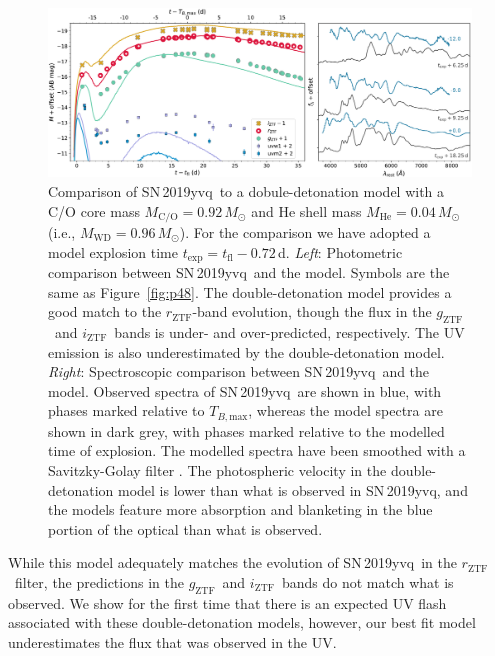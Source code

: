\documentclass[twocolumn]{aastex63}
\newcommand{\rztf}{$r_\mathrm{ZTF}$}
\newcommand{\gztf}{$g_\mathrm{ZTF}$}
\newcommand{\iztf}{$i_\mathrm{ZTF}$}
\newcommand{\tbmax}{$T_{B,\mathrm{max}}$}
\newcommand{\sn}{SN\,2019yvq}
\begin{document}
\begin{figure}
    \centering
    \includegraphics[width=\textwidth]{./figures/double_det.pdf}
    \caption{Comparison of \sn\ to a dobule-detonation model with a C/O core
    mass $M_\mathrm{C/O} = 0.92\,M_\odot$ and He shell mass $M_\mathrm{He} =
    0.04\,M_\odot$ (i.e., $M_\mathrm{WD} = 0.96\,M_\odot$). For the comparison
    we have adopted a model explosion time $t_\mathrm{exp} = t_\mathrm{fl} -
    0.72$\,d. \textit{Left}: Photometric comparison between \sn\ and the
    model. Symbols are the same as Figure~\ref{fig:p48}. The double-detonation
    model provides a good match to the \rztf-band evolution, though the flux
    in the \gztf\ and \iztf\ bands is under- and over-predicted, respectively.
    The UV emission is also underestimated by the double-detonation model.
    \textit{Right}: Spectroscopic comparison between \sn\ and the model.
    Observed spectra of \sn\ are shown in blue, with phases marked relative to
    \tbmax, whereas the model spectra are shown in dark grey, with phases
    marked relative to the modelled time of explosion. The modelled spectra
    have been smoothed with a Savitzky-Golay filter \citep{Savitzky64}. The
    photospheric velocity in the double-detonation model is lower than what is
    observed in \sn, and the models feature more absorption and blanketing in
    the blue portion of the optical than what is observed. }
    \label{fig:double_det}
\end{figure}

While this model adequately matches the evolution of \sn\ in the \rztf\
filter, the predictions in the \gztf\ and \iztf\ bands do not match what is
observed. We show for the first time that there is an expected UV flash
associated with these double-detonation models, however, our best fit model
underestimates the flux that was observed in the UV.
\end{document}
